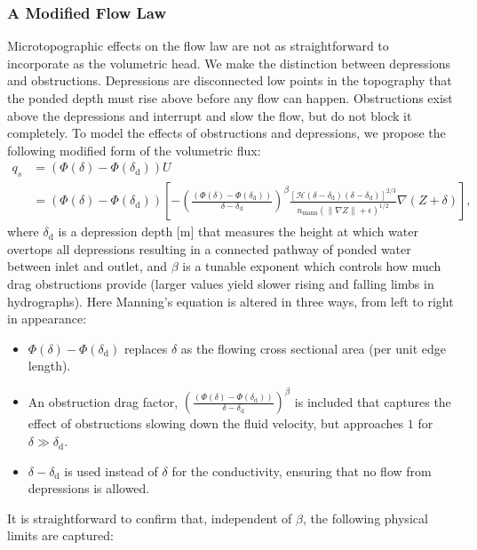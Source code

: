 \subsubsection{A Modified Flow Law}
Microtopographic effects on the flow law are not as straightforward to incorporate as the volumetric head.
We make the distinction between depressions and obstructions.
Depressions are disconnected low points in the topography that the ponded depth must rise above before any flow can happen.
Obstructions exist above the depressions and interrupt and slow the flow, but do not block it completely.
To model the effects of obstructions and depressions, we propose the following modified form of the volumetric flux:
%
\begin{align}
\label{modified-velocity}
q_s &= \left( \Phi(\delta) - \Phi(\delta_\text{d}) \right) U \nonumber \\
    &= \left( \Phi(\delta) - \Phi(\delta_\text{d}) \right)\left[- \left(\frac{\left( \Phi(\delta) - \Phi(\delta_\text{d}) \right)}{\delta - \delta_\text{d}}\right)^\beta \frac{ \left[ \mathcal{H} \left( \delta - \delta_\text{d}\right )\left(\delta - \delta_\text{d}\right)\right]^{2/3} }{n_\text{mann} (\| \nabla Z \| +\epsilon)^{1/2}} \nabla(Z + \delta) \right],
\end{align}
%
where $\delta_\text{d}$ is a depression depth [m] that measures the height at which water overtops all depressions resulting in a connected pathway of ponded water between inlet and outlet, and $\beta$ is a tunable exponent which controls how much drag obstructions provide (larger values yield slower rising and falling limbs in hydrographs).
Here Manning's equation is altered in three ways, from left to right in appearance:
%
\begin{itemize}
\item $\Phi(\delta) - \Phi(\delta_\text{d})$ replaces $\delta$ as the flowing cross sectional area (per unit edge length).
\item An obstruction drag factor, $\left(\frac{\left( \Phi(\delta) - \Phi(\delta_\text{d}) \right)}{\delta - \delta_\text{d}}\right)^\beta$ is included that captures the effect of obstructions slowing down the fluid velocity, but approaches $1$ for $\delta \gg \delta_\text{d}$.
\item $\delta - \delta_\text{d}$ is used instead of $\delta$ for the conductivity, ensuring that no flow from depressions is allowed.
\end{itemize}
%
It is straightforward to confirm that, independent of $\beta$, the following physical limits are captured:
